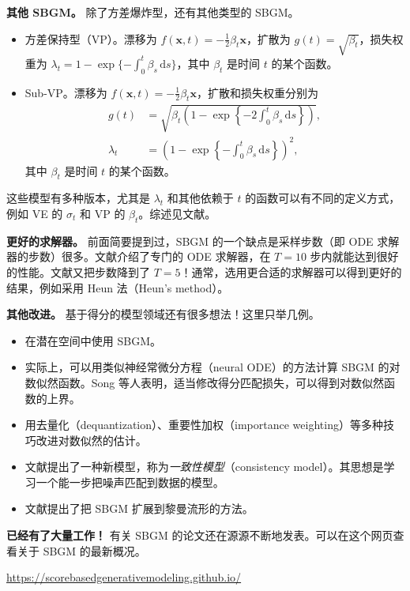 \textbf{其他 SBGM。} 除了方差爆炸型，还有其他类型的 SBGM。
\begin{itemize}
  \item 方差保持型（VP）。漂移为 $f(\mathbf x,t)=-\frac12\beta_t\mathbf x$，扩散为 $g(t)=\sqrt{\beta_t}$，损失权重为 $\lambda_t=1-\exp\{-\int_0^t\beta_s\,\mathrm ds\}$，其中 $\beta_t$ 是时间 $t$ 的某个函数。
  \item Sub-VP。漂移为 $f(\mathbf x,t)=-\frac12\beta_t\mathbf x$，扩散和损失权重分别为
  \[
    \begin{aligned}
      g(t)&=\sqrt{\beta_t\left(1-\exp\left\{-2\int_0^t\beta_s\,\mathrm ds\right\}\right)},\\
      \lambda_t&=\left(1-\exp\left\{-\int_0^t\beta_s\,\mathrm ds\right\}\right)^2,
    \end{aligned}
  \]
  其中 $\beta_t$ 是时间 $t$ 的某个函数。
\end{itemize}
这些模型有多种版本，尤其是 $\lambda_t$ 和其他依赖于 $t$ 的函数可以有不同的定义方式，例如 VE 的 $\sigma_t$ 和 VP 的 $\beta_t$。综述见文献。

\textbf{更好的求解器。} 前面简要提到过，SBGM 的一个缺点是采样步数（即 ODE 求解器的步数）很多。文献介绍了专门的 ODE 求解器，在 $T=10$ 步内就能达到很好的性能。文献又把步数降到了 $T=5$！通常，选用更合适的求解器可以得到更好的结果，例如采用 Heun 法（Heun's method）。

\textbf{其他改进。} 基于得分的模型领域还有很多想法！这里只举几例。
\begin{itemize}
  \item 在潜在空间中使用 SBGM。
  \item 实际上，可以用类似神经常微分方程（neural ODE）的方法计算 SBGM 的对数似然函数。Song 等人表明，适当修改得分匹配损失，可以得到对数似然函数的上界。
  \item 用去量化（dequantization）、重要性加权（importance weighting）等多种技巧改进对数似然的估计。
  \item 文献提出了一种新模型，称为\emph{一致性模型}（consistency model）。其思想是学习一个能一步把噪声匹配到数据的模型。
  \item 文献提出了把 SBGM 扩展到黎曼流形的方法。
\end{itemize}

\textbf{已经有了大量工作！} 有关 SBGM 的论文还在源源不断地发表。可以在这个网页查看关于 SBGM 的最新概况。
\begin{center}
  \url{https://scorebasedgenerativemodeling.github.io/}
\end{center}
